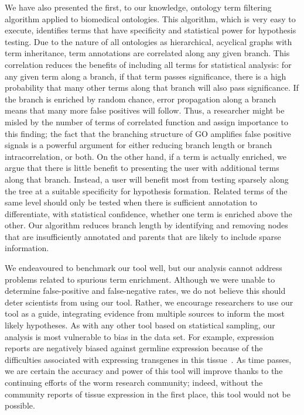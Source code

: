 We have also presented the first, to our knowledge, ontology term filtering
algorithm applied to biomedical ontologies. This algorithm, which is very easy
to execute, identifies terms that have specificity and statistical power for
hypothesis testing. Due to the nature of all ontologies as hierarchical, acyclical
graphs with term inheritance, term annotations are correlated along any given
branch. This correlation reduces the benefits of including all terms for
statistical analysis: for any given term along a branch, if that term passes
significance, there is a high probability that many other terms along that branch
will also pass significance. If the branch is enriched by random chance, error
propagation along a branch means that many more false positives will follow.
Thus, a researcher might be misled by the number of terms of correlated function
and assign importance to this finding; the fact that the branching structure of
GO amplifies false positive signals is a powerful argument for either reducing
branch length or branch intracorrelation, or both. On the other hand, if a term
is actually enriched, we argue that there is little benefit to presenting the
user with additional terms along that branch. Instead, a user will benefit most
from testing sparsely along the tree at a suitable specificity for hypothesis
formation. Related terms of the same level should only be tested when there is
sufficient annotation to differentiate, with statistical confidence, whether one
term is enriched above the other. Our algorithm reduces branch length by
identifying and removing nodes that are insufficiently annotated and parents
that are likely to include sparse information.


We endeavoured to benchmark our tool well, but our analysis cannot address
problems related to spurious term enrichment. Although we were unable to
determine false-positive and false-negative rates, we do not believe this should
deter scientists from using our tool. Rather, we encourage researchers to use our
tool as a guide, integrating evidence from multiple sources to inform the most
likely hypotheses. As with any other tool based on statistical sampling, our
analysis is most vulnerable to bias in the data set. For example, expression
reports are negatively biased against germline expression because of the
difficulties associated with expressing transgenes in this
tissue~\citep{Kelly1997}. As time passes, we are certain the accuracy and power
of this tool will improve thanks to the continuing efforts of the  worm research
community; indeed, without the community reports of tissue expression in the
first place, this tool would not be possible.

